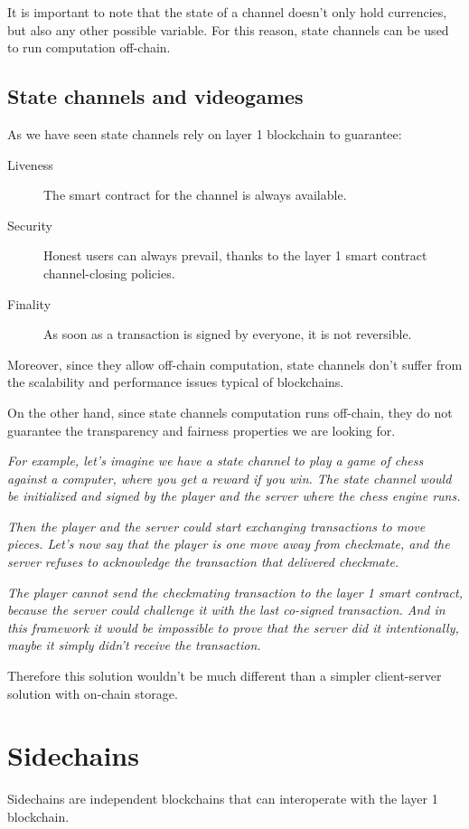 \documentclass[12pt]{article}
\begin{document}
It is important to note that the state of a channel doesn't only hold currencies, but also any other possible variable. For this reason, state channels can be used to run computation off-chain.

\subsection{State channels and videogames} \label{subsection:scav}
As we have seen state channels rely on layer 1 blockchain to guarantee:
\begin{description}
    \item[Liveness] The smart contract for the channel is always available. 
    \item[Security] Honest users can always prevail, thanks to the layer 1 smart contract channel-closing policies.
    \item[Finality] As soon as a transaction is signed by everyone, it is not reversible.
\end{description}

Moreover, since they allow off-chain computation, state channels don't suffer from the scalability and performance issues typical of blockchains.

On the other hand, since state channels computation runs off-chain, they do not guarantee the transparency and fairness properties we are looking for.

\textit{For example, let's imagine we have a state channel to play a game of chess against a computer, where you get a reward if you win. The state channel would be initialized and signed by the player and the server where the chess engine runs.}
    
\textit{Then the player and the server could start exchanging transactions to move pieces. Let's now say that the player is one move away from checkmate, and the server refuses to acknowledge the transaction that delivered checkmate.}
    
\textit{The player cannot send the checkmating transaction to the layer 1 smart contract, because the server could challenge it with the last co-signed transaction. And in this framework it would be impossible to prove that the server did it intentionally, maybe it simply didn't receive the transaction.}

Therefore this solution wouldn't be much different than a simpler client-server solution with on-chain storage.

\section{Sidechains} \label{section:sidechains}
Sidechains are independent blockchains that can interoperate with the layer 1 blockchain.
\end{document}

